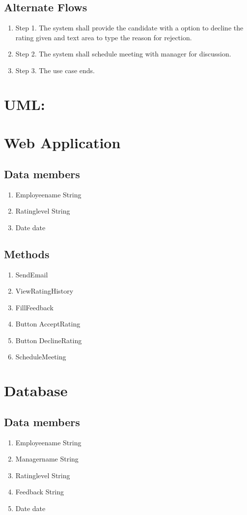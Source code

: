 \documentclass[10 pm]{article}
\begin{document}
\subsection{Alternate Flows}
\begin{enumerate}
\item Step 1.  The system shall provide the candidate with a option to decline the rating given
 and text area to type the reason for rejection.
\item Step 2. The system shall schedule meeting with manager for discussion.
\item Step 3. The use case ends.
\end{enumerate}

\section * {UML:}

\section *{Web Application}
\subsection{Data members}
\begin{enumerate}
\item Employeename String
\item Ratinglevel String
\item Date date
\end{enumerate}

\subsection{Methods}
\begin{enumerate}
\item SendEmail
\item ViewRatingHistory
\item FillFeedback
\item Button AcceptRating
\item Button DeclineRating
\item ScheduleMeeting
\end{enumerate}

\section *{Database}
\subsection{Data members}
\begin{enumerate}
\item Employeename String
\item Managername String
\item Ratinglevel String
\item Feedback String
\item Date date
\end{enumerate}
\end{document}
